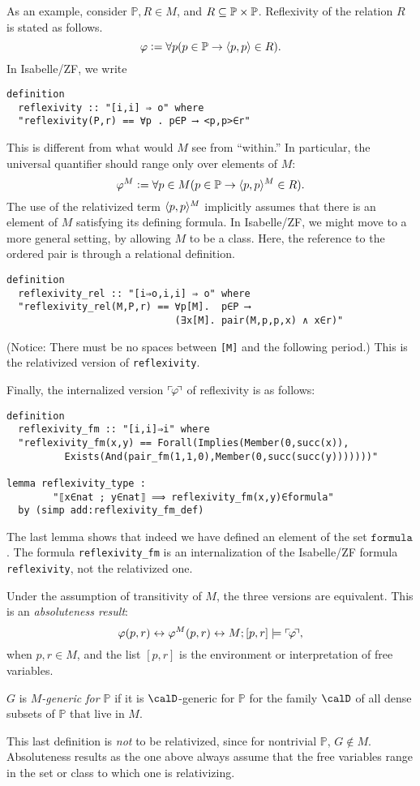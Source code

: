 \documentclass[11pt,english]{article}
\renewcommand{\PP}{\mathbb{P}}
\newcommand{\formula}{\ensuremath{\mathtt{formula}}}
\begin{document}
As an example, consider $\PP,R \in M$,  and $R\sbq
\PP\times\PP$. Reflexivity of the relation $R$ is 
stated as follows.
\[
\phi\defi \forall p (p\in \PP \limp \lb p,p\rb \in R).
\]
In Isabelle/ZF, we write
%
\begin{verbatim}
definition 
  reflexivity :: "[i,i] ⇒ o" where
  "reflexivity(P,r) == ∀p . p∈P ⟶ <p,p>∈r"
\end{verbatim}

This is different from what would $M$ see from ``within.'' In
particular, the universal quantifier should range only over elements
of $M$:
\[
\phi^M\defi\forall p\in M (p\in \PP \limp \lb p,p\rb^M \in R).
\]
The use of the relativized term $\langle p,p\rangle^M$ implicitly assumes that
there is an element of $M$ satisfying its defining formula. In
Isabelle/ZF, we might move to a more general setting, by allowing  $M$
to be a class. Here, the reference to the ordered pair  is through a
relational definition.
\begin{verbatim}
definition  
  reflexivity_rel :: "[i⇒o,i,i] ⇒ o" where
  "reflexivity_rel(M,P,r) == ∀p[M].  p∈P ⟶ 
                             (∃x[M]. pair(M,p,p,x) ∧ x∈r)"
\end{verbatim}
(Notice: There must be no spaces between \verb|[M]| and the following
period.) This is the relativized version of
\verb|reflexivity|. 

Finally, the internalized version $\ulcorner{\!\varphi\!}\urcorner$ of reflexivity is as
follows: 
\begin{verbatim}
definition
  reflexivity_fm :: "[i,i]⇒i" where
  "reflexivity_fm(x,y) == Forall(Implies(Member(0,succ(x)),
          Exists(And(pair_fm(1,1,0),Member(0,succ(succ(y)))))))"

lemma reflexivity_type : 
        "⟦x∈nat ; y∈nat⟧ ⟹ reflexivity_fm(x,y)∈formula"
  by (simp add:reflexivity_fm_def)
\end{verbatim}

The last lemma shows that indeed we have defined an element of the set
\formula. The formula \verb|reflexivity_fm| is an internalization of
the Isabelle/ZF formula \verb|reflexivity|, not the relativized
one.

Under the assumption of transitivity of $M$, the three versions are
equivalent. This is an \emph{absoluteness result}:
\[
\varphi(p,r) \leftrightarrow \varphi^M(p,r) \leftrightarrow M;[p,r]\models\ulcorner{\!\varphi\!}\urcorner,
\]
when $p,r\in M$, and the list $[p,r]$ is the environment or
interpretation of free variables. 

\begin{definition}
  $G$ is \emph{$M$-generic for $\PP$} if it is $\calD$-generic for
  $\PP$ for the family $\calD$ of all dense subsets of $\PP$ that live
  in $M$.
\end{definition}
This last definition is \emph{not} to be relativized, since for
nontrivial $\PP$, $G\notin M$. Absoluteness results as the one above
always assume that the free variables range in the set or class to
which one is relativizing.
\end{document}
